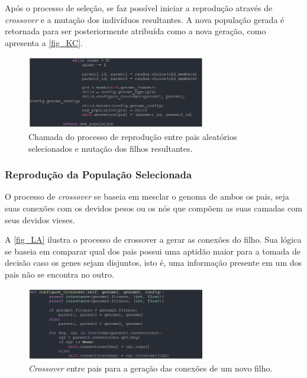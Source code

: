 Após o processo de seleção, se faz possível iniciar a reprodução através de \textit{crossover} e a mutação dos indivíduos resultantes. A nova população gerada é retornada para ser posteriormente atribuída como a nova geração, como apresenta a \autoref{fig_KC}.

\begin{figure}[htb]
        \centering
        \caption{\label{fig_KC}Chamada do processo de reprodução entre pais aleatórios selecionados e mutação dos filhos resultantes.}
        \includegraphics[width=0.7\textwidth]{images/KC.png}
\end{figure}

\subsubsection{Reprodução da População Selecionada}

O processo de \textit{crossover} se baseia em mesclar o genoma de ambos os pais, seja suas conexões com os devidos pesos ou os nós que compõem as suas camadas com seus devidos vieses.

A \autoref{fig_LA} ilustra o processo de crossover a gerar as conexões do filho. Sua lógica se baseia em comparar qual dos pais possui uma aptidão maior para a tomada de decisão caso os genes sejam disjuntos, isto é, uma informação presente em um dos pais não se encontra no outro.

\begin{figure}[htb]
        \centering
        \caption{\label{fig_LA}\textit{Crossover} entre pais para a geração das conexões de um novo filho.}
        \includegraphics[width=0.7\textwidth]{images/LA.png}
\end{figure}

